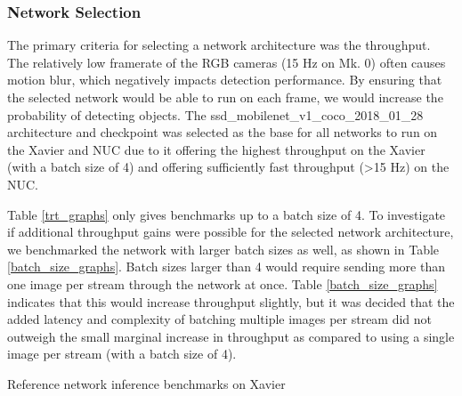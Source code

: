 \subsubsection{Network Selection}

The primary criteria for selecting a network architecture was the throughput. The relatively low framerate of the RGB cameras (15 Hz on Mk. 0) often causes motion blur, which negatively impacts detection performance. By ensuring that the selected network would be able to run on each frame, we would increase the probability of detecting objects. The ssd\_mobilenet\_v1\_coco\_2018\_01\_28 architecture and checkpoint was selected as the base for all networks to run on the Xavier and NUC due to it offering the highest throughput on the Xavier (with a batch size of 4) and offering sufficiently fast throughput (>15 Hz) on the NUC.

Table \ref{trt_graphs} only gives benchmarks up to a batch size of 4. To investigate if additional throughput gains were possible for the selected network architecture, we benchmarked the network with larger batch sizes as well, as shown in Table \ref{batch_size_graphs}. Batch sizes larger than 4 would require sending more than one image per stream through the network at once. Table \ref{batch_size_graphs} indicates that this would increase throughput slightly, but it was decided that the added latency and complexity of batching multiple images per stream did not outweigh the small marginal increase in throughput as compared to using a single image per stream (with a batch size of 4).

\begin{table}
	\centering
	\begin{adjustbox}{max width=.9\textwidth}
	\end{adjustbox}
	\caption{Reference network inference benchmarks on Xavier}
	\label{batch_size_graphs}
\end{table}

